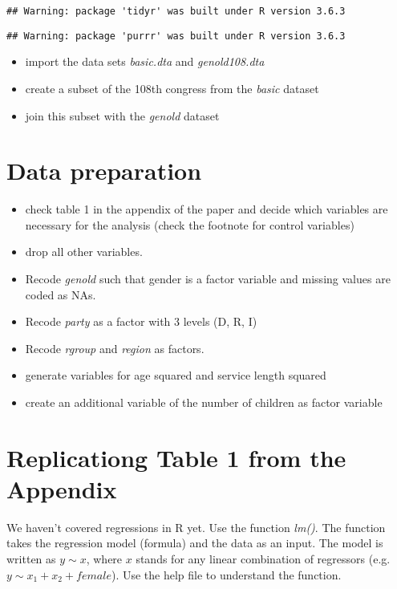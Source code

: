 \documentclass[]{article}
\providecommand{\tightlist}{%
  \setlength{\itemsep}{0pt}\setlength{\parskip}{0pt}}
\begin{document}
\begin{verbatim}
## Warning: package 'tidyr' was built under R version 3.6.3
\end{verbatim}

\begin{verbatim}
## Warning: package 'purrr' was built under R version 3.6.3
\end{verbatim}

\begin{itemize}
\tightlist
\item
  import the data sets \emph{basic.dta} and \emph{genold108.dta}
\item
  create a subset of the 108th congress from the \emph{basic} dataset
\item
  join this subset with the \emph{genold} dataset
\end{itemize}

\hypertarget{data-preparation}{%
\section{Data preparation}\label{data-preparation}}

\begin{itemize}
\tightlist
\item
  check table 1 in the appendix of the paper and decide which variables
  are necessary for the analysis (check the footnote for control
  variables)
\item
  drop all other variables.
\item
  Recode \emph{genold} such that gender is a factor variable and missing
  values are coded as NAs.
\item
  Recode \emph{party} as a factor with 3 levels (D, R, I)
\item
  Recode \emph{rgroup} and \emph{region} as factors.
\item
  generate variables for age squared and service length squared
\item
  create an additional variable of the number of children as factor
  variable
\end{itemize}

\hypertarget{replicationg-table-1-from-the-appendix}{%
\section{Replicationg Table 1 from the
Appendix}\label{replicationg-table-1-from-the-appendix}}

We haven't covered regressions in R yet. Use the function \emph{lm()}.
The function takes the regression model (formula) and the data as an
input. The model is written as \(y \sim x\), where \(x\) stands for any
linear combination of regressors (e.g.~\(y \sim x_1 + x_2 + female\)).
Use the help file to understand the function.
\end{document}
